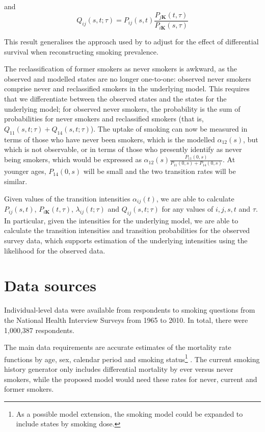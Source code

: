 \documentclass[11pt,a4paper]{article}
\newcommand{\K}{\ensuremath{\bm{K}}}
\begin{document}
\noindent and
\[Q_{ij}(s,t;\tau)=P_{ij}(s,t)\frac{P_{j\K}(t,\tau)}{P_{i\K}(s,\tau)}
\]

This result generalises the approach used by
\citet{harris_cigarette_1983} to adjust for the effect of differential
survival when reconstructing smoking prevalence.

The reclassification of former smokers as never smokers is awkward, as the observed and modelled states are no longer one-to-one: observed never smokers comprise never and reclassified smokers in the underlying model. This requires that we differentiate between the observed states and the states for the underlying model; for observed never smokers, the probability is the sum of probabilities for never smokers and reclassified smokers (that is, $Q_{11}(s,t;\tau)+Q_{14}(s,t;\tau)$). The uptake of smoking can now be measured in terms of those who have never been smokers, which is the modelled $\alpha_{12}(s)$, but which is not observable, or in terms of those who presently identify as never being smokers, which would be expressed as $\alpha_{12}(s)\frac{P_{11}(0,s)}{P_{11}(0,s)+P_{14}(0,s)}$. At younger ages, $P_{14}(0,s)$ will be small and the two transition rates will be similar.

Given values of the transition intensities $\alpha_{ij}(t)$, we are
able to calculate $P_{ij}(s,t)$, $P_{i\K}(t,\tau)$,
$\lambda_{ij}(t;\tau)$ and $Q_{ij}(s,t;\tau)$ for any values of
$i,j,s,t$ and $\tau$.  In particular, given the intensities for the
underlying model, we are able to calculate the transition intensities
and transition probabilities for the observed survey data, which supports estimation of the underlying intensities using the likelihood for the observed data.


\section{Data sources}


Individual-level data were available from respondents to smoking questions from the National Health Interview Surveys from 1965 to 2010. In total, there were 1,000,387 respondents. 

The main data requirements are accurate estimates of the mortality
rate functions by age, sex, calendar period and smoking
status\footnote{As a possible model extension, the smoking model could
  be expanded to include states by smoking dose.}  . The current
smoking history generator only includes differential mortality by ever
versus never smokers, while the proposed model would need these rates
for never, current and former smokers.
\end{document}
